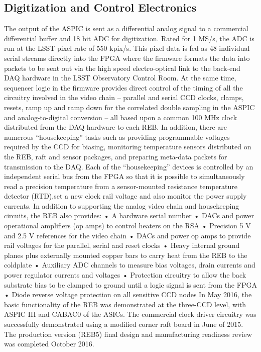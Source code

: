 \subsection{Digitization and Control Electronics}
The output of the ASPIC is sent as a differential analog signal to a commercial differential buffer and 18 bit ADC for digitization. Rated for 1 MS/s, the ADC is run at the LSST pixel rate of 550 kpix/s. This pixel data is fed as 48 individual serial streams directly into the FPGA where the firmware formats the data into packets to be sent out via the high speed electro-optical link to the back-end DAQ hardware in the LSST Observatory Control Room. At the same time, sequencer logic in the firmware provides direct control of the timing of all the circuitry involved in the video chain – parallel and serial CCD clocks, clamps, resets, ramp up and ramp down for the correlated double sampling in the ASPIC and analog-to-digital conversion – all based upon a common 100 MHz clock distributed from the DAQ hardware to each REB. In addition, there are numerous “housekeeping” tasks such as providing programmable voltages required by the CCD for biasing, monitoring temperature sensors distributed on the REB, raft and sensor packages, and preparing meta-data packets for transmission to the DAQ. Each of the “housekeeping” devices is controlled by an independent serial bus from the FPGA so that it is possible to simultaneously read a precision temperature from a sensor-mounted resistance temperature detector (RTD),set a new clock rail voltage and also monitor the power supply currents.
In addition to supporting the analog video chain and housekeeping circuits, the REB also provides:
•	A hardware serial number
•	DACs and power operational amplifiers (op amps) to control heaters on the RSA
•	Precision 5 V and 2.5 V references for the video chain
•	DACs and power op amps to provide rail voltages for the parallel, serial and reset clocks
•	Heavy internal ground planes plus externally mounted copper bars to carry heat from the REB to the coldplate
•	Auxiliary ADC channels to measure bias voltages, drain currents and power regulator currents and voltages
•	Protection circuitry to allow the back substrate bias to be clamped to ground until a logic signal is sent from the FPGA
•	Diode reverse voltage protection on all sensitive CCD nodes
In May 2016, the basic functionality of the REB was demonstrated at the three-CCD level, with ASPIC III and CABAC0 of the ASICs. The commercial clock driver circuitry was successfully demonstrated using a modified corner raft board in June of 2015. The production version (REB5) final design and manufacturing readiness review was completed October 2016.

